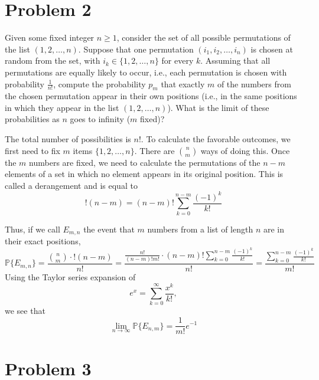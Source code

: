 \documentclass[11pt]{article}
\newcommand{\bbP}{\mathbb{P}}
\begin{document}
\section*{Problem 2}
\begin{problem}
    Given some fixed integer \( n \geq 1 \), consider the set of all possible permutations of the list \( (1, 2, \ldots, n) \). Suppose that one permutation \( (i_1, i_2, \ldots, i_n) \) is chosen at random from the set, with \( i_k \in \{1, 2, \ldots, n\} \) for every \( k \). Assuming that all permutations are equally likely to occur, i.e., each permutation is chosen with probability \( \frac{1}{n!} \), compute the probability \( p_m \) that exactly \( m \) of the numbers from the chosen permutation appear in their own positions (i.e., in the same positions in which they appear in the list \( (1, 2, \ldots, n) \)). What is the limit of these probabilities as \( n \) goes to infinity (\( m \) fixed)?
\end{problem}
\begin{solution}
The total number of possibilities is $n!.$ To calculate the favorable outcomes, we first need to fix $m$ items $\{1,2,\dots, n\}.$ There are $\binom{n}{m}$ ways of doing this. Once the $m$ numbers are fixed, we need to calculate the permutations of the $n-m$ elements of a set in which no element appears in its original position. This is called a derangement and is equal to 
\[!(n-m) = (n-m)! \sum_{k=0}^{n-m} \frac{(-1)^k}{k!}\]

Thus, if we call $E_{m,n}$ the event that $m$ numbers from a list of length $n$ are in their exact positions, 
\[\boxed{\bbP\{E_{m,n}\} = \frac{\binom{n}{m}\cdot !(n-m)}{n!} = \frac{\frac{n!}{(n-m)! m!} \cdot (n-m)! \sum_{k=0}^{n-m} \frac{(-1)^k}{k!}}{n!} = \frac{\sum_{k=0}^{n-m} \frac{(-1)^k}{k!}    }{m!}}\]
Using the Taylor series expansion of 
\[e^x = \sum_{k=0}^\infty \frac{x^k}{k!},\] we see that 
\[\boxed{\lim_{n\to \infty}\bbP\{E_{n,m}\} = \frac{1}{m!}e^{-1}}\]

\end{solution}

\newpage
\section*{Problem 3}

\begin{problem}
    
\end{problem}


\newpage
\end{document}
